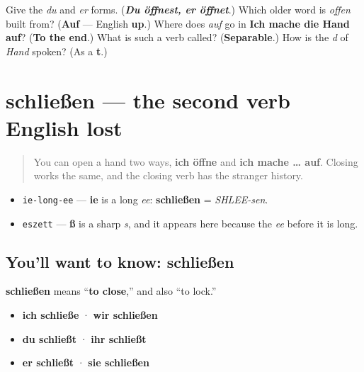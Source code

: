 \begin{tcolorbox}[breakable,colback=teal!4,colframe=teal!35!black,title={Before you move on}]
Give the \emph{du} and \emph{er} forms. (\emph{\textbf{Du öffnest, er öffnet}}.) Which older word is \emph{offen} built from? (\textbf{Auf} — English \textbf{up}.) Where does \emph{auf} go in \textbf{Ich mache die Hand auf}? (\textbf{To the end}.) What is such a verb called? (\textbf{Separable}.) How is the \emph{d} of \emph{Hand} spoken? (As a \textbf{t}.)
\end{tcolorbox}
\section[schließen]{schließen — the second verb English lost}

\label{lesson:GE-C27-schliessen}



\begin{quote}
You can open a hand two ways, \textbf{ich öffne} and \textbf{ich mache … auf}. Closing works the same, and the closing verb has the stranger history.
\end{quote}

\begin{sounds}
\begin{itemize}
\raggedright
  \item \texttt{ie-long-ee} — \textbf{ie} is a long \emph{ee}: \textbf{schließen} = \emph{SHLEE-sen}.
  \item \texttt{eszett} — \textbf{ß} is a sharp \emph{s}, and it appears here because the \emph{ee} before it is long.
\end{itemize}
\end{sounds}

\subsection*{You'll want to know: schließen}
\textbf{schließen} means \textquotedblleft{}\textbf{to close},\textquotedblright{} and also \textquotedblleft{}to lock.\textquotedblright{}

\begin{itemize}
\raggedright
  \item \textbf{ich schließe} · \textbf{wir schließen}
  \item \textbf{du schließt} · \textbf{ihr schließt}
  \item \textbf{er schließt} · \textbf{sie schließen}
\end{itemize}

